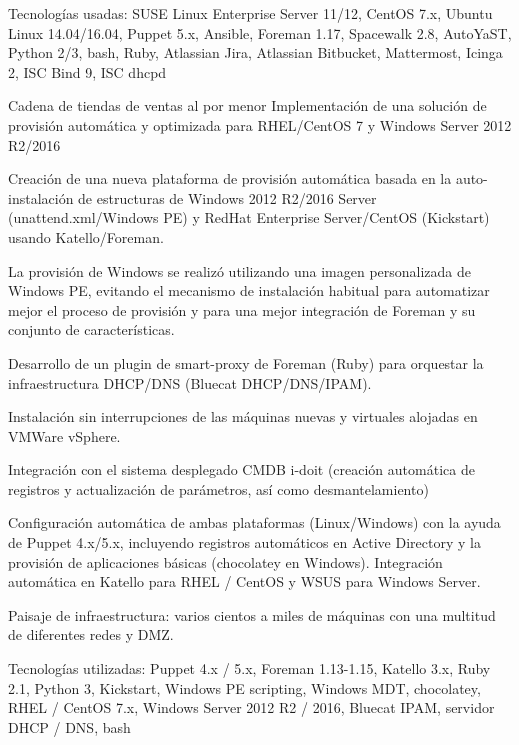 \begin{cventries}
{\begin{cvitems}
 \item Tecnologías usadas: SUSE Linux Enterprise Server 11/12, CentOS 7.x, Ubuntu Linux
        14.04/16.04, Puppet 5.x, Ansible, Foreman 1.17, Spacewalk 2.8, AutoYaST, Python 2/3, bash,
        Ruby, Atlassian Jira, Atlassian Bitbucket, Mattermost, Icinga 2, ISC Bind 9, ISC dhcpd
      \end{cvitems}
    }
  \cventry
    {Cadena de tiendas de ventas al por menor}
    {Implementación de una solución de provisión automática y optimizada para RHEL/CentOS 7 y Windows Server 2012 R2/2016}
    {}
    {}
    {
      \begin{cvitems}
      \item Creación de una nueva plataforma de provisión automática basada en la auto-instalación de estructuras de
      Windows 2012 R2/2016 Server (unattend.xml/Windows PE) y RedHat Enterprise Server/CentOS (Kickstart) usando Katello/Foreman.
      \item La provisión de Windows se realizó utilizando una imagen personalizada de Windows PE, evitando el mecanismo de instalación habitual para automatizar mejor el proceso de provisión y para una mejor integración de Foreman y su conjunto de características.
      \item Desarrollo de un plugin de smart-proxy de Foreman (Ruby) para orquestar la infraestructura DHCP/DNS (Bluecat DHCP/DNS/IPAM).
      \item Instalación sin interrupciones de las máquinas nuevas y virtuales alojadas en VMWare vSphere.
      \item Integración con el sistema desplegado CMDB i-doit (creación automática de registros y actualización de parámetros, así como desmantelamiento)
      \item Configuración automática de ambas plataformas (Linux/Windows) con la ayuda de Puppet 4.x/5.x,
      incluyendo registros automáticos en Active Directory y la provisión de aplicaciones básicas
      (chocolatey en Windows). Integración automática en Katello para RHEL / CentOS y WSUS para Windows Server.
      \item Paisaje de infraestructura: varios cientos a miles de máquinas con una multitud de diferentes redes y DMZ.
      \item Tecnologías utilizadas: Puppet 4.x / 5.x, Foreman 1.13-1.15, Katello 3.x, Ruby 2.1, Python 3, Kickstart, Windows PE scripting, Windows MDT, chocolatey, RHEL / CentOS 7.x, Windows Server 2012 R2 / 2016, Bluecat IPAM, servidor DHCP / DNS, bash


\end{cvitems}}
\end{cventries}

